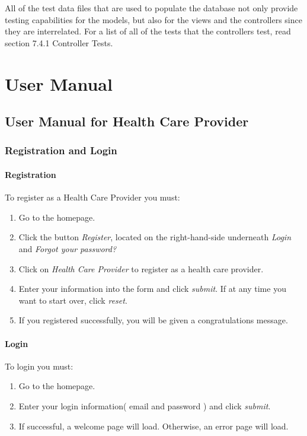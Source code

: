 \documentclass[12pt]{report}
\begin{document}
All of the test data files that are used to populate the database not only provide testing capabilities for the models, but also for the views and the controllers since they are interrelated.  For a list of all of the tests that the controllers test, read section 7.4.1 Controller Tests.


\part{User Manual}

\chapter{User Manual for Health Care Provider}

\section{Registration and Login}
\subsection{Registration}
To register as a Health Care Provider you must:
\begin{enumerate}
\item Go to the homepage.
\item Click the button \textit{Register}, located on the right-hand-side underneath \textit{Login} and \textit{Forgot your password?}
\item Click on \textit{Health Care Provider} to register as a health care provider.
\item Enter your information into the form and click \textit{submit}. If at any time you want to start over, click \textit{reset}.
\item If you registered successfully, you will be given a congratulations message.
\end{enumerate}
\subsection{Login}
To login you must:
\begin{enumerate}
\item Go to the homepage.
\item Enter your login information( email and password ) and click \textit{submit}.
\item If successful, a welcome page will load. Otherwise, an error page will load. 
\end{enumerate}
\end{document}
